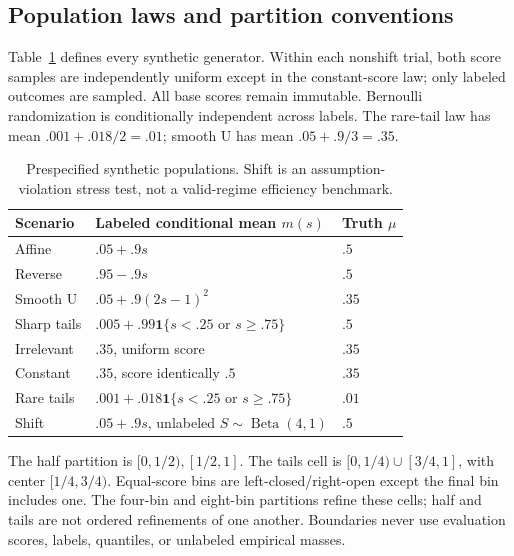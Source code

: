 \documentclass{article}
\begin{document}
\subsection{Population laws and partition conventions}
Table~\ref{tab:dgps} defines every synthetic generator. Within each nonshift trial, both score samples are independently uniform except in the constant-score law; only labeled outcomes are sampled. All base scores remain immutable. Bernoulli randomization is conditionally independent across labels. The rare-tail law has mean $.001+.018/2=.01$; smooth U has mean $.05+.9/3=.35$.
\begin{table}[h]
\centering
\caption{Prespecified synthetic populations. Shift is an assumption-violation stress test, not a valid-regime efficiency benchmark.}\label{tab:dgps}
\begin{tabular}{lll}\toprule
Scenario & Labeled conditional mean $m(s)$ & Truth $\mu$\\\midrule
Affine & $.05+.9s$ & $.5$\\
Reverse & $.95-.9s$ & $.5$\\
Smooth U & $.05+.9(2s-1)^2$ & $.35$\\
Sharp tails & $.005+.99\mathbf1\{s<.25\text{ or }s\geq.75\}$ & $.5$\\
Irrelevant & $.35$, uniform score & $.35$\\
Constant & $.35$, score identically $.5$ & $.35$\\
Rare tails & $.001+.018\mathbf1\{s<.25\text{ or }s\geq.75\}$ & $.01$\\
Shift & $.05+.9s$, unlabeled $S\sim\operatorname{Beta}(4,1)$ & $.5$\\\bottomrule
\end{tabular}
\end{table}
The half partition is $[0,1/2),[1/2,1]$. The tails cell is $[0,1/4)\cup[3/4,1]$, with center $[1/4,3/4)$. Equal-score bins are left-closed/right-open except the final bin includes one. The four-bin and eight-bin partitions refine these cells; half and tails are not ordered refinements of one another. Boundaries never use evaluation scores, labels, quantiles, or unlabeled empirical masses.
\end{document}
